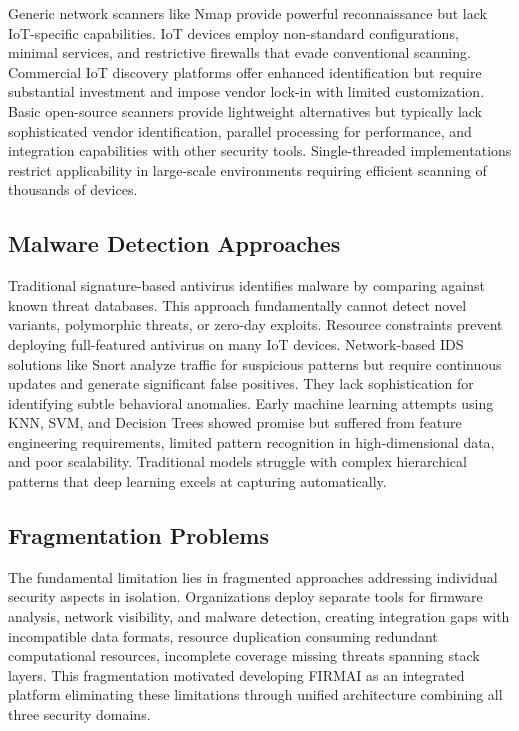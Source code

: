 Generic network scanners like Nmap provide powerful reconnaissance but lack IoT-specific capabilities. IoT devices employ non-standard configurations, minimal services, and restrictive firewalls that evade conventional scanning. Commercial IoT discovery platforms offer enhanced identification but require substantial investment and impose vendor lock-in with limited customization. Basic open-source scanners provide lightweight alternatives but typically lack sophisticated vendor identification, parallel processing for performance, and integration capabilities with other security tools. Single-threaded implementations restrict applicability in large-scale environments requiring efficient scanning of thousands of devices.

\subsection{Malware Detection Approaches}

Traditional signature-based antivirus identifies malware by comparing against known threat databases. This approach fundamentally cannot detect novel variants, polymorphic threats, or zero-day exploits. Resource constraints prevent deploying full-featured antivirus on many IoT devices. Network-based IDS solutions like Snort analyze traffic for suspicious patterns but require continuous updates and generate significant false positives. They lack sophistication for identifying subtle behavioral anomalies. Early machine learning attempts using KNN, SVM, and Decision Trees showed promise but suffered from feature engineering requirements, limited pattern recognition in high-dimensional data, and poor scalability. Traditional models struggle with complex hierarchical patterns that deep learning excels at capturing automatically.

\subsection{Fragmentation Problems}

The fundamental limitation lies in fragmented approaches addressing individual security aspects in isolation. Organizations deploy separate tools for firmware analysis, network visibility, and malware detection, creating integration gaps with incompatible data formats, resource duplication consuming redundant computational resources, incomplete coverage missing threats spanning stack layers. This fragmentation motivated developing FIRMAI as an integrated platform eliminating these limitations through unified architecture combining all three security domains.

